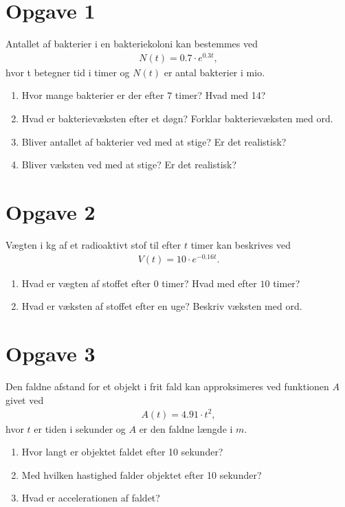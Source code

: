 \documentclass[12pt]{article}
\begin{document}
\section*{Opgave 1}
Antallet af bakterier i en bakteriekoloni kan bestemmes ved
\begin{align*}
N(t) = 0.7\cdot e^{0.3t},
\end{align*}
hvor t betegner tid i timer og $N(t)$ er antal bakterier i mio. 
\begin{enumerate}
\item Hvor mange bakterier er der efter $7$ timer? Hvad med 14?
\item Hvad er bakterievæksten efter et døgn? Forklar bakterievæksten med ord.
\item Bliver antallet af bakterier ved med at stige? Er det realistisk? 
\item Bliver væksten ved med at stige? Er det realistisk?
\end{enumerate}
\section*{Opgave 2}
Vægten i kg af et radioaktivt stof til efter $t$ timer kan beskrives ved
\begin{align*}
V(t) =10\cdot e^{-0.16t}.
\end{align*}
\begin{enumerate}
\item Hvad er vægten af stoffet efter $0$ timer? Hvad med efter $10$ timer?
\item Hvad er væksten af stoffet efter en uge? Beskriv væksten med ord.
\end{enumerate}
\section*{Opgave 3}
Den faldne afstand for et objekt i frit fald kan approksimeres ved funktionen $A$ givet ved
\begin{align*}
A(t) = 4.91 \cdot t^2, 
\end{align*}
hvor $t$ er tiden i sekunder og $A$ er den faldne længde i $m$.
\begin{enumerate}
\item Hvor langt er objektet faldet efter 10 sekunder?
\item Med hvilken hastighed falder objektet efter 10 sekunder?
\item Hvad er accelerationen af faldet?
\end{enumerate}
\end{document}
